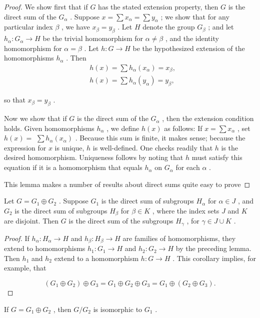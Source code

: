 \begin{proof}We show first that if \(G\) has the stated extension property, then \(G\) is the direct sum of the \({G}_{\alpha }\) . Suppose \(x = \sum {x}_{\alpha } = \sum {y}_{\alpha }\) ; we show that for any particular index \(\beta\) , we have \({x}_{\beta } = {y}_{\beta }\) . Let \(H\) denote the group \({G}_{\beta }\) ; and let \({h}_{\alpha } : {G}_{\alpha } \rightarrow  H\) be the trivial homomorphism for \(\alpha  \neq  \beta\) , and the identity homomorphism for \(\alpha  = \beta\) . Let \(h : G \rightarrow  H\) be the hypothesized extension of the homomorphisms \({h}_{\alpha }\) . Then
\[
\begin{aligned}  & h\left( x\right)  = \sum {h}_{\alpha }\left( {x}_{\alpha }\right)  = {x}_{\beta }, \\  & h\left( x\right)  = \sum {h}_{\alpha }\left( {y}_{\alpha }\right)  = {y}_{\beta }, \end{aligned}
\]

so that \({x}_{\beta } = {y}_{\beta }\) .

Now we show that if \(G\) is the direct sum of the \({G}_{\alpha }\) , then the extension condition holds. Given homomorphisms \({h}_{\alpha }\) , we define \(h\left( x\right)\) as follows: If \(x = \sum {x}_{\alpha }\) , set \(h\left( x\right)  =\)  \(\sum {h}_{\alpha }\left( {x}_{\alpha }\right)\) . Because this sum is finite, it makes sense; because the expression for \(x\) is unique, \(h\) is well-defined. One checks readily that \(h\) is the desired homomorphism. Uniqueness follows by noting that \(h\) must satisfy this equation if it is a homomorphism that equals \({h}_{\alpha }\) on \({G}_{\alpha }\) for each \(\alpha\) .

This lemma makes a number of results about direct sums quite easy to prove
\end{proof}
\begin{corollary} Let \(G = {G}_{1} \oplus  {G}_{2}\) . Suppose \({G}_{1}\) is the direct sum of subgroups \({H}_{\alpha }\) for \(\alpha  \in  J\) , and \({G}_{2}\) is the direct sum of subgroups \({H}_{\beta }\) for \(\beta  \in  K\) , where the index sets \(J\) and \(K\) are disjoint. Then \(G\) is the direct sum of the subgroups \({H}_{\gamma }\) , for \(\gamma  \in  J \cup  K\) .
\end{corollary}

\begin{proof}If \({h}_{\alpha } : {H}_{\alpha } \rightarrow  H\) and \({h}_{\beta } : {H}_{\beta } \rightarrow  H\) are families of homomorphisms, they extend to homomorphisms \({h}_{1} : {G}_{1} \rightarrow  H\) and \({h}_{2} : {G}_{2} \rightarrow  H\) by the preceding lemma. Then \({h}_{1}\) and \({h}_{2}\) extend to a homomorphism \(h : G \rightarrow  H\) .
This corollary implies, for example, that

\[
\left( {{G}_{1} \oplus  {G}_{2}}\right)  \oplus  {G}_{3} = {G}_{1} \oplus  {G}_{2} \oplus  {G}_{3} = {G}_{1} \oplus  \left( {{G}_{2} \oplus  {G}_{3}}\right) .
\]
\end{proof}
\begin{corollary} If \(G = {G}_{1} \oplus  {G}_{2}\) , then \(G/{G}_{2}\) is isomorphic to \({G}_{1}\) .
\end{corollary}

